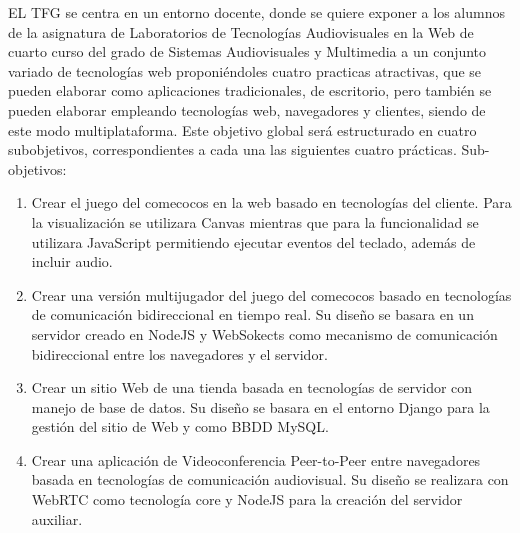 \documentclass[notes,slidesec,a4]{seminar}
\begin{document}

\begin{hslide}
EL TFG se centra en un entorno docente, donde se quiere exponer a los alumnos de la asignatura de Laboratorios de Tecnologías Audiovisuales en la Web de cuarto curso del grado de Sistemas Audiovisuales y Multimedia  a un conjunto variado de tecnologías web proponiéndoles cuatro practicas atractivas, que se pueden elaborar como aplicaciones tradicionales, de escritorio, pero también se pueden elaborar empleando tecnologías web, navegadores y clientes, siendo de este modo multiplataforma. Este objetivo global será estructurado en cuatro subobjetivos, correspondientes a cada una las siguientes cuatro prácticas.
Sub-objetivos:
\begin{enumerate}
\item  Crear el juego del comecocos en la web basado en tecnologías del cliente. Para la visualización se utilizara Canvas mientras que para la funcionalidad se utilizara JavaScript permitiendo ejecutar eventos del teclado, además de incluir audio.
\item Crear una versión multijugador del juego del comecocos basado en tecnologías de comunicación bidireccional en tiempo real. Su diseño se basara en un servidor creado en NodeJS y WebSokects como mecanismo de comunicación bidireccional entre los navegadores y el servidor.
\item Crear un sitio Web de una tienda basada en tecnologías de servidor con manejo de base de datos. Su diseño se basara en el entorno Django para la gestión del sitio de Web y como BBDD MySQL.
\item Crear una aplicación de Videoconferencia Peer-to-Peer entre navegadores basada en tecnologías de comunicación audiovisual. Su diseño se realizara con WebRTC como tecnología core y NodeJS para la creación del servidor auxiliar.
\end{enumerate}
\end{hslide}
\end{document}
